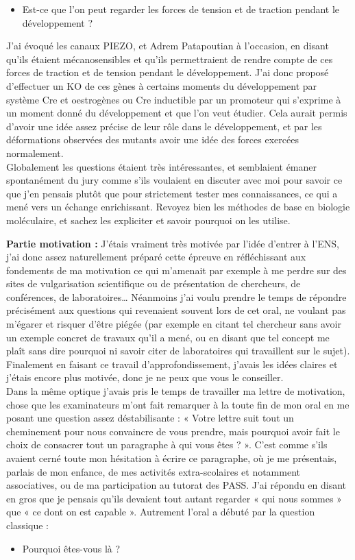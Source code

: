 \begin{itemize}
    \item Est-ce que l’on peut regarder les forces de tension et de traction pendant le développement ? 
\end{itemize}

J’ai évoqué les canaux PIEZO, et Adrem Patapoutian à l’occasion, en disant qu’ils étaient mécanosensibles et qu'ils permettraient de rendre compte de ces forces de traction et de tension pendant le développement. J’ai donc proposé d’effectuer un KO de ces gènes à certains moments du développement par système Cre et oestrogènes ou Cre inductible par un promoteur qui s’exprime à un moment donné du développement et que l’on veut étudier. Cela aurait permis d’avoir une idée assez précise de leur rôle dans le développement, et par les déformations observées des mutants avoir une idée des forces exercées normalement. \\

Globalement les questions étaient très intéressantes, et semblaient émaner spontanément du jury comme s’ils voulaient en discuter avec moi pour savoir ce que j’en pensais plutôt que pour strictement tester mes connaissances, ce qui a mené vers un échange enrichissant. Revoyez bien les méthodes de base en biologie moléculaire, et sachez les expliciter et savoir pourquoi on les utilise. 

\textbf{Partie motivation :}  J’étais vraiment très motivée par l’idée d’entrer à l’ENS, j’ai donc assez naturellement préparé cette épreuve en réfléchissant aux fondements de ma motivation ce qui m’amenait par exemple à me perdre sur des sites de vulgarisation scientifique ou de présentation de chercheurs, de conférences, de laboratoires… Néanmoins j’ai voulu prendre le temps de répondre précisément aux questions qui revenaient souvent lors de cet oral, ne voulant pas m’égarer et risquer d’être piégée (par exemple en citant tel chercheur sans avoir un exemple concret de travaux qu’il a mené, ou en disant que tel concept me plaît sans dire pourquoi ni savoir citer de laboratoires qui travaillent sur le sujet). Finalement en faisant ce travail d’approfondissement, j’avais les idées claires et j’étais encore plus motivée, donc je ne peux que vous le conseiller. \\
Dans la même optique j’avais pris le temps de travailler ma lettre de motivation, chose que les examinateurs m’ont fait remarquer à la toute fin de mon oral en me posant une question assez déstabilisante : « Votre lettre suit tout un cheminement pour nous convaincre de vous prendre, mais pourquoi avoir fait le choix de consacrer tout un paragraphe à qui vous êtes ? ». C’est comme s’ils avaient cerné toute mon hésitation à écrire ce paragraphe, où je me présentais, parlais de mon enfance, de mes activités extra-scolaires et notamment associatives, ou de ma participation au tutorat des PASS. J’ai répondu en disant en gros que je pensais qu’ils devaient tout autant regarder « qui nous sommes » que « ce dont on est capable ». Autrement l’oral a débuté par la question classique : 
\begin{itemize}
    \item Pourquoi êtes-vous là ?
\end{itemize}

